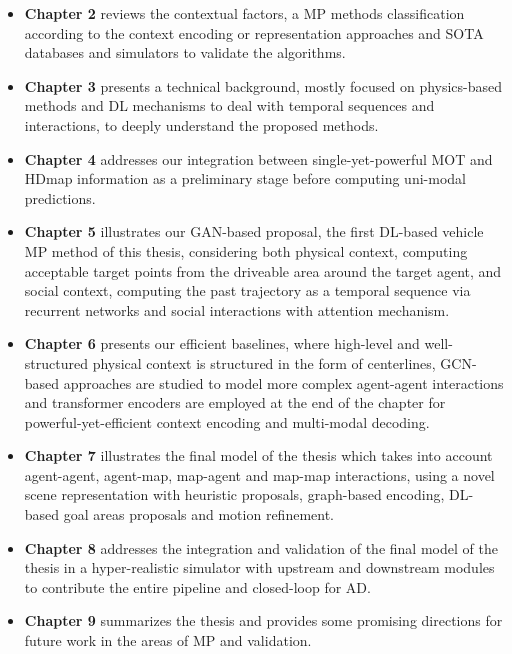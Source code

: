 \begin{itemize}
	
	\item \textbf{Chapter 2} reviews the contextual factors, a \ac{MP} methods classification according to the context encoding or representation approaches and \ac{SOTA} databases and simulators to validate the algorithms. 
	
	\item \textbf{Chapter 3} presents a technical background, mostly focused on physics-based methods and \ac{DL} mechanisms to deal with temporal sequences and interactions, to deeply understand the proposed methods.
	
	\item \textbf{Chapter 4} addresses our integration between single-yet-powerful \ac{MOT} and \ac{HDmap} information as a preliminary stage before computing uni-modal predictions.
	
	\item \textbf{Chapter 5} illustrates our \ac{GAN}-based proposal, the first \ac{DL}-based vehicle \ac{MP} method of this thesis, considering both physical context, computing acceptable target points from the driveable area around the target agent, and social context, computing the past trajectory as a temporal sequence via recurrent networks and social interactions with attention mechanism.
	
	\item \textbf{Chapter 6} presents our efficient baselines, where high-level and well-structured physical context is structured in the form of centerlines, \ac{GCN}-based approaches are studied to model more complex agent-agent interactions and transformer encoders are employed at the end of the chapter for powerful-yet-efficient context encoding and multi-modal decoding.
	
	\item \textbf{Chapter 7} illustrates the final model of the thesis which takes into account agent-agent, agent-map, map-agent and map-map interactions, using a novel scene representation with heuristic proposals, graph-based encoding, \ac{DL}-based goal areas proposals and motion refinement.
	
	\item \textbf{Chapter 8} addresses the integration and validation of the final model of the thesis in a hyper-realistic simulator with upstream and downstream modules to contribute the entire pipeline and closed-loop for \ac{AD}.
	
	\item \textbf{Chapter 9} summarizes the thesis and provides some promising directions for future work in the areas of \ac{MP} and validation.
	
\end{itemize}
